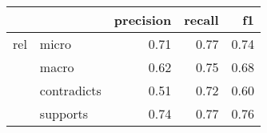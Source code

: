 \begin{tabular}{llrrr}
\toprule
    &          &  precision &  recall &   f1 \\
\midrule
rel & micro &       0.71 &    0.77 & 0.74 \\
    & macro &       0.62 &    0.75 & 0.68 \\
    & contradicts &       0.51 &    0.72 & 0.60 \\
    & supports &       0.74 &    0.77 & 0.76 \\
\bottomrule
\end{tabular}
